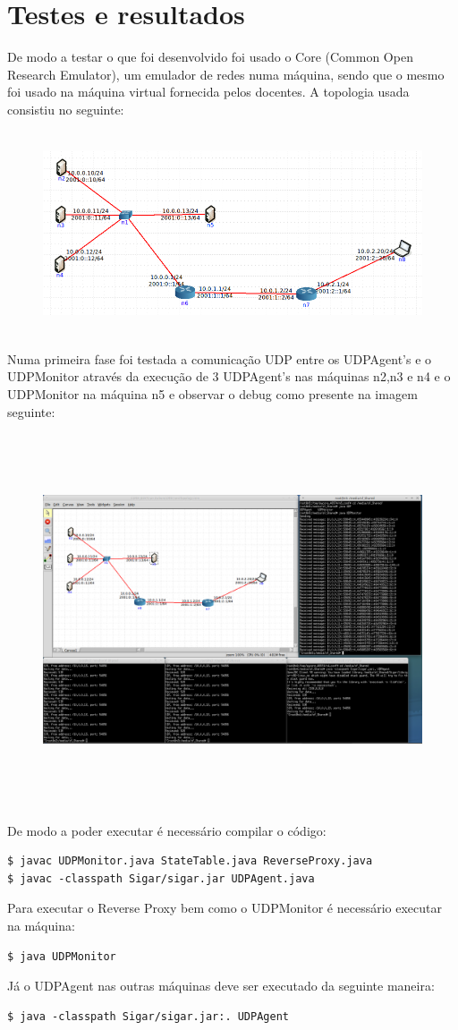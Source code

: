 \documentclass{article}
\begin{document}
\section{Testes e resultados}
De modo a testar o que foi desenvolvido foi usado o Core (Common Open Research Emulator), um emulador de redes numa máquina, sendo que o mesmo foi usado na máquina virtual fornecida pelos docentes. A topologia usada consistiu no seguinte:
\begin{figure}[H]
	\centering
	\includegraphics[height=6cm]{topologia.png}
\end{figure}
Numa primeira fase foi testada a comunicação UDP entre os UDPAgent's e o UDPMonitor através da execução de 3 UDPAgent's nas máquinas n2,n3 e n4 e o UDPMonitor na máquina n5 e observar o debug como presente na imagem seguinte:
\begin{figure}[H]
	\advance\leftskip-2cm
    \includegraphics[height=11cm]{teste1.png}
\end{figure}
De modo a poder executar é necessário compilar o código:
\begin{verbatim}
$ javac UDPMonitor.java StateTable.java ReverseProxy.java
$ javac -classpath Sigar/sigar.jar UDPAgent.java
\end{verbatim}
Para executar o Reverse Proxy bem como o UDPMonitor é necessário executar na máquina:
\begin{verbatim}
$ java UDPMonitor
\end{verbatim}
Já o UDPAgent nas outras máquinas deve ser executado da seguinte maneira:
\begin{verbatim}
$ java -classpath Sigar/sigar.jar:. UDPAgent
\end{verbatim}
\end{document}
